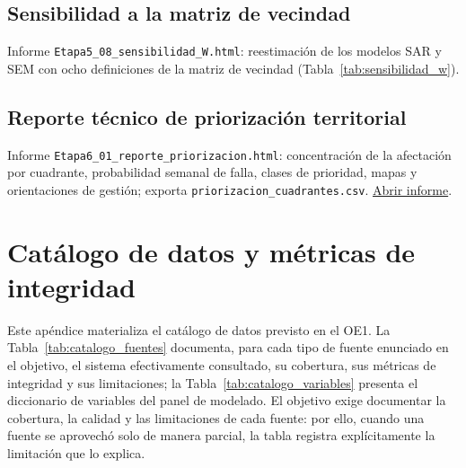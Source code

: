 \subsection{Sensibilidad a la matriz de vecindad}
\label{app:html-etapa5-08}
Informe \texttt{Etapa5\_08\_sensibilidad\_W.html}: reestimación de los modelos SAR y SEM con ocho definiciones de la matriz de vecindad (Tabla~\ref{tab:sensibilidad_w}).

\subsection{Reporte técnico de priorización territorial}
\label{app:html-etapa6-01}
Informe \texttt{Etapa6\_01\_reporte\_priorizacion.html}: concentración de la afectación por cuadrante, probabilidad semanal de falla, clases de prioridad, mapas y orientaciones de gestión; exporta \texttt{priorizacion\_cuadrantes.csv}.
\href{\urlEtapaSeisUno}{Abrir informe}.

\section{Catálogo de datos y métricas de integridad}
\label{app:catalogo}

Este apéndice materializa el catálogo de datos previsto en el OE1. La Tabla~\ref{tab:catalogo_fuentes} documenta, para cada tipo de fuente enunciado en el objetivo, el sistema efectivamente consultado, su cobertura, sus métricas de integridad y sus limitaciones; la Tabla~\ref{tab:catalogo_variables} presenta el diccionario de variables del panel de modelado. El objetivo exige documentar la cobertura, la calidad y las limitaciones de cada fuente: por ello, cuando una fuente se aprovechó solo de manera parcial, la tabla registra explícitamente la limitación que lo explica.

